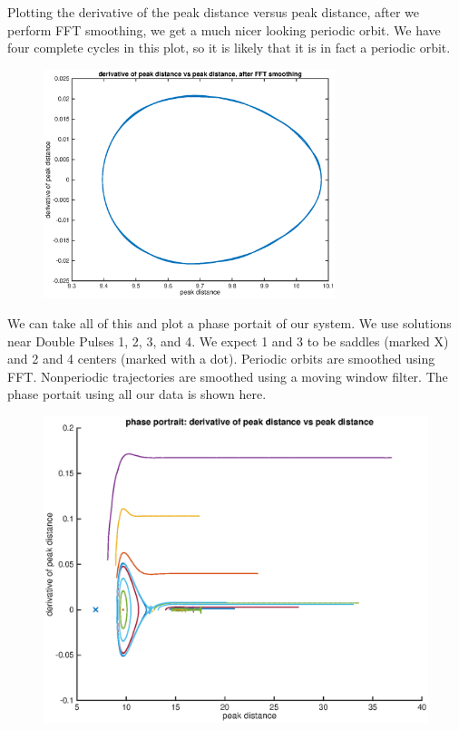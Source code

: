 \documentclass[12pt]{article}
\begin{document}
Plotting the derivative of the peak distance versus peak distance, after we perform FFT smoothing, we get a much nicer looking periodic orbit. We have four complete cycles in this plot, so it is likely that it is in fact a periodic orbit.

\begin{figure}[H]
	\includegraphics[width=8.5cm]{peakderivdistsmooth}
\end{figure}

\pagebreak

We can take all of this and plot a phase portait of our system. We use solutions near Double Pulses 1, 2, 3, and 4. We expect 1 and 3 to be saddles (marked X) and 2 and 4 centers (marked with a dot). Periodic orbits are smoothed using FFT. Nonperiodic trajectories are smoothed using a moving window filter. The phase portait using all our data is shown here.
\begin{figure}[H]
	\includegraphics[width=17cm]{phase1}
\end{figure}
\end{document}

